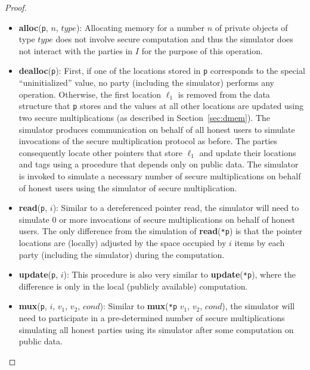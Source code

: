 \documentclass[11pt]{article}
\begin{document}
\begin{proof}
\begin{itemize}
  \item \textbf{alloc}(\texttt{p}, $n$, $type$): Allocating memory for a
    number $n$ of private objects of type $type$ does not involve secure
    computation and thus the simulator does not interact with the parties in
    $I$ for the purpose of this operation. 
    
  \item \textbf{dealloc}(\texttt{p}): First, if one of the locations stored
    in \texttt{p} corresponds to the special ``uninitialized'' value, no
    party (including the simulator) performs any operation. Otherwise, the
    first location $\ell_1$ is removed from the data structure that
    \texttt{p} stores and the values at all other locations are updated
    using two secure multiplications (as described in
    Section~\ref{sec:dmem}). The simulator produces communication on behalf
    of all honest users to simulate invocations of the secure multiplication
    protocol as before. The parties consequently locate other pointers that
    store $\ell_1$ and update their locations and tags using a procedure
    that depends only on public data. The simulator is invoked to simulate
    a necessary number of secure multiplications on behalf of honest users
    using the simulator of secure multiplication.
    
  \item \textbf{read}(\texttt{p}, $i$): Similar to a dereferenced pointer
    read, the simulator will need to simulate 0 or more invocations of
    secure multiplications on behalf of honest users. The only difference
    from the simulation of \textbf{read}(\texttt{*p}) is that the pointer
    locations are (locally) adjusted by the space occupied by $i$ items by
    each party (including the simulator) during the computation.
    
  \item \textbf{update}(\texttt{p}, $i$): This procedure is also very
    similar to \textbf{update}(\texttt{*p}), where the difference is only in
    the local (publicly available) computation. 
    
  \item \textbf{mux}(\texttt{p}, $i$, $v_1$, $v_2$, $cond$): Similar to
    \textbf{mux}(\texttt{*p} $v_1$, $v_2$, $cond$), the simulator will need
    to participate in a pre-determined number of secure multiplications
    simulating all honest parties using its simulator after some computation
    on public data.
    

\end{itemize}
\end{proof}
\end{document}
